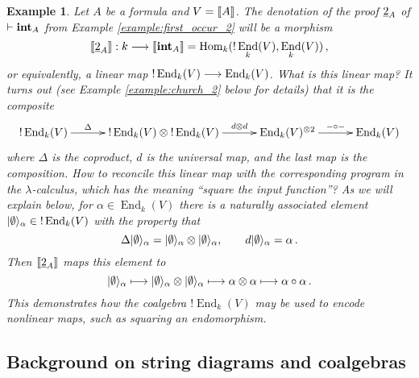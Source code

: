 \documentclass[english,letter paper,12pt,reqno]{article}
\DeclarePairedDelimiter\ket{\lvert}{\rangle}
\theoremstyle{example}
\newtheorem{example}[theorem]{Example}
\def\Hom{\operatorname{Hom}}
\def\vacu{\ket{\emptyset}}
\DeclareMathOperator{\End}{End}
\def\inta{\bold{int}}
\begin{document}
\begin{example}\label{example:2_denotation_preview} Let $A$ be a formula and $V = \llbracket A \rrbracket$. The denotation of the proof $\underline{2}_A$ of $\vdash \inta_A$ from Example \ref{example:first_occur_2} will be a morphism
\begin{equation}\label{eq:2_as_comp_0}
\den{\church{2}_A}: k \lto \den{\inta_A} = \Hom_k( {!} \End_k(V), \End_k(V) )\,,
\end{equation}
or equivalently, a linear map ${!} \End_k(V) \lto \End_k(V)$. What is this linear map? It turns out (see Example \ref{example:church_2} below for details) that it is the composite
\begin{equation}\label{eq:2_as_comp}
\xymatrix@C+0.5pc{
{!} \End_k(V) \ar[r]^-{\Delta} & {!} \End_k(V) \otimes {!} \End_k(V) \ar[r]^-{d \otimes d} & \End_k(V)^{\otimes 2} \ar[r]^-{- \circ -} & \End_k(V)
}
\end{equation}
where $\Delta$ is the coproduct, $d$ is the universal map, and the last map is the composition. How to reconcile this linear map with the corresponding program in the $\lambda$-calculus, which has the meaning ``square the input function''? As we will explain below, for $\alpha \in \End_k( V )$ there is a naturally associated element $\vacu_\alpha \in {!} \End_k(V)$ with the property that
\[
\Delta \vacu_\alpha = \vacu_\alpha \otimes \vacu_\alpha, \qquad d \vacu_\alpha = \alpha\,.
\]
Then $\llbracket \underline{2}_A \rrbracket$ maps this element to
\begin{equation}\label{eq:2_deals_with_0}
\vacu_\alpha \longmapsto \vacu_\alpha \otimes \vacu_\alpha \longmapsto \alpha \otimes \alpha \longmapsto \alpha \circ \alpha\,.
\end{equation}
This demonstrates how the coalgebra ${!} \End_k(V)$ may be used to encode nonlinear maps, such as squaring an endomorphism.
\end{example}

\subsection{Background on string diagrams and coalgebras}\label{section:stringdiag}

\end{document}
